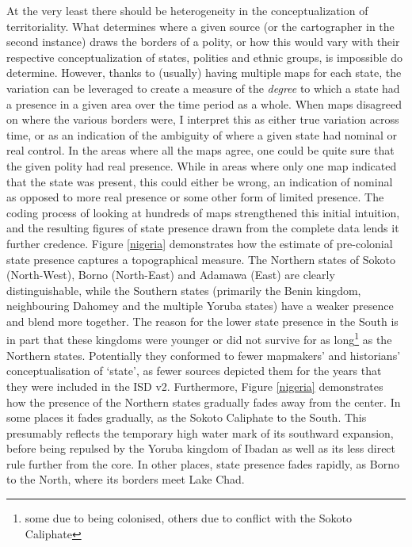 \documentclass[12pt]{article}
\begin{document}
At the very least there should be heterogeneity in the conceptualization of
territoriality. What determines where a given source (or the cartographer in the
second instance) draws the borders of a polity, or how this would vary with
their respective conceptualization of states, polities and ethnic groups, is
impossible do determine. However, thanks to (usually) having multiple maps for
each state, the variation can be leveraged to create a measure of the
\textit{degree} to which a state had a presence in a given area over the time
period as a whole. When maps disagreed on where the various borders were, I
interpret this as either true variation across time, or as an indication of the
ambiguity of where a given state had nominal or real control. In the areas where
all the maps agree, one could be quite sure that the given polity had real
presence.  While in areas where only one map indicated that the state was
present, this could either be wrong, an indication of nominal as opposed to more
real presence or some other form of limited presence. The coding process of
looking at hundreds of maps strengthened this initial intuition, and the
resulting figures of state presence drawn from the complete data lends it
further credence. Figure \ref{nigeria} demonstrates how the estimate of
pre-colonial state presence captures a topographical measure. The Northern
states of Sokoto (North-West), Borno (North-East) and Adamawa (East) are clearly
distinguishable, while the Southern states (primarily the Benin kingdom,
neighbouring Dahomey and the multiple Yoruba states) have a weaker presence and
blend more together. The reason for the lower state presence in the South is in
part that these kingdoms were younger or did not survive for as
long\footnote{some due to being colonised, others due to conflict with the
Sokoto Caliphate} as the Northern states. Potentially they conformed to fewer
mapmakers' and historians' conceptualisation of `state', as fewer sources
depicted them for the years that they were included in the ISD v2. Furthermore,
Figure \ref{nigeria} demonstrates how the presence of the Northern states
gradually fades away from the center. In some places it fades gradually, as the
Sokoto Caliphate to the South. This presumably reflects the temporary high water
mark of its southward expansion, before being repulsed by the Yoruba kingdom of
Ibadan as well as its less direct rule further from the core. In other places,
state presence fades rapidly, as Borno to the North, where its borders meet Lake
Chad.

\end{document}
